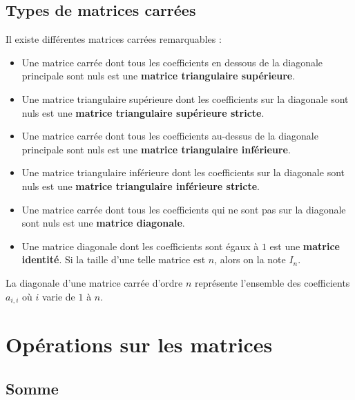 	\subsection{Types de matrices carrées}

	\begin{formula}
		Il existe différentes matrices carrées remarquables :
		\begin{itemize}
			\item Une matrice carrée dont tous les coefficients en dessous de la diagonale principale sont nuls est une \textbf{matrice triangulaire supérieure}.
			\item Une matrice triangulaire supérieure dont les coefficients sur la diagonale sont nuls est une \textbf{matrice triangulaire supérieure stricte}.
			\item Une matrice carrée dont tous les coefficients au-dessus de la diagonale principale sont nuls est une \textbf{matrice triangulaire inférieure}.
			\item Une matrice triangulaire inférieure dont les coefficients sur la diagonale sont nuls est une \textbf{matrice triangulaire inférieure stricte}.
			\item Une matrice carrée dont tous les coefficients qui ne sont pas sur la diagonale sont nuls est une \textbf{matrice diagonale}.
			\item Une matrice diagonale dont les coefficients sont égaux à $1$ est une \textbf{matrice identité}. Si la taille d'une telle matrice est $n$, alors on la note $I_n$.
		\end{itemize}
	\end{formula}

	\begin{tip}
		La diagonale d'une matrice carrée d'ordre $n$ représente l'ensemble des coefficients $a_{i,i}$ où $i$ varie de $1$ à $n$.
	\end{tip}

	\section{Opérations sur les matrices}

	\subsection{Somme}

